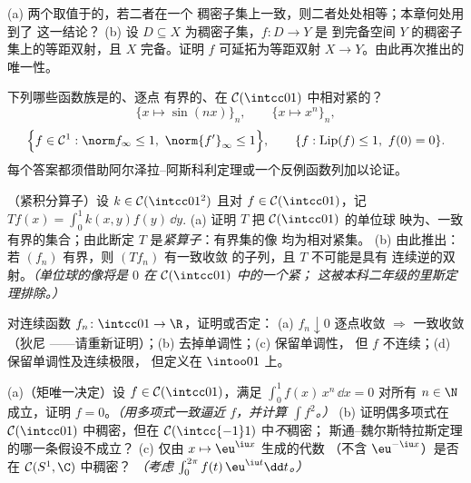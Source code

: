 \begin{exercise}[$\star\star$]\label{exo:b3:complete:5}
(a) 两个取值于的，若二者在一个
稠密子集上一致，则二者处处相等；本章何处用到了
这一结论？
(b) 设 $D \subseteq X$ 为稠密子集，$f \colon D \to Y$ 是
到完备空间 $Y$ 的稠密子集上的等距双射，且
$X$ 完备。证明 $f$ 可延拓为等距双射
$X \to Y$。由此再次推出的唯一性。
\end{exercise}

\begin{exercise}[$\star\star$]\label{exo:b3:complete:6}
下列哪些函数族是的、逐点
有界的、在 $\mathcal C(\intcc01)$ 中相对紧的？
\[
\{x \mapsto \sin(nx)\}_{n},\qquad
\{x \mapsto x^n\}_n,
\]
\[
\Bigl\{f \in \mathcal C^1 : \norm f_\infty \leq 1,\
\norm{f'}_\infty \leq 1\Bigr\},\qquad
\{f : \operatorname{Lip}(f)\leq 1,\ f(0) = 0\}.
\]
每个答案都须借助阿尔泽拉–阿斯科利定理或一个反例函数列加以论证。
\end{exercise}

\begin{exercise}[$\star\star\star$]\label{exo:b3:complete:7}
（紧积分算子）设 $k \in \mathcal C(\intcc01^2)$
且对 $f \in \mathcal C(\intcc01)$，记 $Tf(x) =
\int_0^1k(x,y)f(y)\,\dd y$.
(a) 证明 $T$ 把 $\mathcal C(\intcc01)$ 的单位球
映为、一致有界的集合；由此断定 $T$
是\emph{紧算子}：有界集的像
均为相对紧集。
(b) 由此推出：若 $(f_n)$ 有界，则 $(Tf_n)$ 有一致收敛
的子列，且 $T$ 不可能是具有
连续逆的双射。\emph{（单位球的像将是
$0$ 在 $\mathcal C(\intcc01)$ 中的一个紧；
这被本科二年级的里斯定理排除。）}
\end{exercise}

\begin{exercise}[$\star\star$]\label{exo:b3:complete:8}
对连续函数 $f_n \colon \intcc01 \to \R$，证明或否定：
(a) $f_n \downarrow 0$ 逐点收敛 $\Rightarrow$ 一致收敛（狄尼
——请重新证明）；(b) 去掉单调性；(c) 保留单调性，
但 $f$ 不连续；(d) 保留单调性及连续极限，
但定义在 $\intoo01$ 上。
\end{exercise}

\begin{exercise}[$\star\star$]\label{exo:b3:complete:9}
(a)（矩唯一决定）设 $f \in \mathcal C(\intcc01)$，满足
$\int_0^1 f(x)\,x^n\,\dd x = 0$ 对所有 $n \in \N$ 成立，证明 $f =
0$。\emph{（用多项式一致逼近 $f$，并计算
$\int f^2$。）}
(b) 证明偶多项式在 $\mathcal
C(\intcc01)$ 中稠密，但在 $\mathcal C(\intcc{-1}1)$ 中\emph{不}稠密；
斯通–魏尔斯特拉斯定理的哪一条假设不成立？
(c) 仅由 $x \mapsto \eu^{\iu x}$ 生成的代数
（不含 $\eu^{-\iu x}$）是否在 $\mathcal C(S^1, \C)$ 中稠密？
\emph{（考虑 $\int_0^{2\pi}f(t)\,\eu^{\iu t}\dd t$。）}
\end{exercise}

